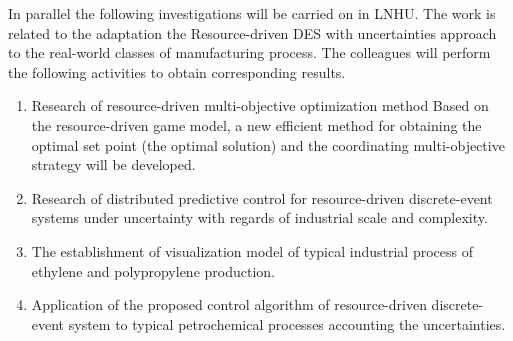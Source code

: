 \documentclass[runningheads]{llncs}
\begin{document}
In parallel the following investigations will be carried on in LNHU. The work is related to the adaptation the Resource-driven DES with uncertainties approach to the real-world classes of manufacturing process. The colleagues will perform the following activities to obtain corresponding results.
\begin{enumerate}
\item Research of resource-driven multi-objective optimization method Based on the resource-driven game model, a new efficient method for obtaining the optimal set point (the optimal solution) and the coordinating multi-objective strategy will be developed. %
\item Research of distributed predictive control for resource-driven discrete-event systems under uncertainty with regards of industrial scale and complexity.
\item The establishment of visualization model of typical industrial process of ethylene and polypropylene production.
\item Application of the proposed control algorithm of resource-driven discrete-event system to typical petrochemical processes accounting the uncertainties.
\end{enumerate}
\end{document}
